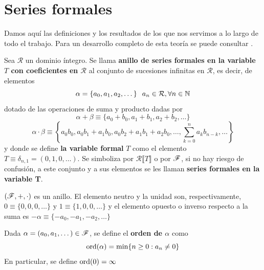 \appendix %

\chapter{Series formales} \label{series formales} %



Damos aquí las definiciones y los resultados de los que nos servimos a lo largo de todo el trabajo. Para un desarrollo completo de esta teoría se puede consultar \cite{sambale}.

\begin{definicion}
    Sea $\mathcal{R}$ un dominio íntegro. Se llama \textbf{anillo de series formales en la variable $T$ con coeficientes en $\mathcal{R}$} al conjunto de sucesiones infinitas en $\mathcal{R}$, es decir, de elementos
    \begin{equation*}
        \alpha = \{a_0, a_1, a_2, \dots \} \hspace{0.25cm} a_n \in \mathcal{R}, \forall n \in \mathbb{N} 
    \end{equation*}
    dotado de las operaciones de suma y producto dadas por
    \begin{equation*}
    \alpha + \beta \equiv \{a_0 + b_0, a_1 + b_1, a_2 + b_2, \dots \}
    \end{equation*}
    \begin{equation*}
    \alpha \cdot \beta \equiv \left\{a_0  b_0, a_0b_1 + a_1b_0, a_0b_2 + a_1b_1 + a_2b_0, \dots, \sum_{k=0}^na_kb_{n-k}, \dots \right\} 
    \end{equation*}
    y donde se define \textbf{la variable formal} $T$ como el elemento $T \equiv \delta_{n,1} = (0,1,0, \dots)$. Se simboliza por $\mathcal{R} \llbracket T \rrbracket$ o por $\mathscr{F}$, si no hay riesgo de confusión, a este conjunto y a sus elementos se les llaman \textbf{series formales en la variable T}.
\end{definicion}

\begin{teorema}
    $(\mathscr{F}, +, \cdot)$ es un anillo. El elemento neutro y la unidad son, respectivamente, $0 \equiv \{0,0,0,\dots\} \text{ y } 1\equiv \{1, 0, 0, \dots\}$ y el elemento opuesto o inverso respecto a la suma es $ -\alpha \equiv \{-a_0, -a_1, -a_2, \dots \}$
\end{teorema}

\begin{definicion} 
    Dada $\alpha = (a_0, a_1, \dots) \in \mathscr{F}$, se define el \textbf{orden de $\alpha$} como
    \begin{equation*}
        \operatorname*{ord}(\alpha) = \min \{ n \geq 0 : a_n \neq 0 \}
    \end{equation*}
    En particular, se define $\operatorname*{ord}(0) = \infty$
\end{definicion}

